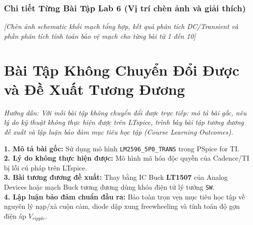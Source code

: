 \documentclass[12pt,a4paper]{report}
\begin{document}
\begin{orangebox}
\centering
\vspace{0.3cm}
\vspace{0.3cm}
\end{orangebox}

\subsection*{Chi tiết Từng Bài Tập Lab 6 (Vị trí chèn ảnh và giải thích)}
\begin{orangebox}
\textit{\color{guidegray}[Chèn ảnh schematic khối mạch tổng hợp, kết quả phân tích DC/Transient và phần phân tích tính toán bảo vệ mạch cho từng bài từ 1 đến 10]}
\end{orangebox}

\chapter{Bài Tập Không Chuyển Đổi Được và Đề Xuất Tương Đương}

\textit{\color{guidegray}
Hướng dẫn: Với mỗi bài tập không chuyển đổi được trực tiếp: mô tả bài gốc, nêu lý do kỹ thuật không thực hiện được trên LTspice, trình bày bài tập tương đương đề xuất và lập luận bảo đảm mục tiêu học tập (Course Learning Outcomes).
}

\begin{orangebox}
\textbf{1. Mô tả bài gốc:} Sử dụng mô hình \texttt{LM2596\_5P0\_TRANS} trong PSpice for TI.\\
\textbf{2. Lý do không thực hiện được:} Mô hình mã hóa độc quyền của Cadence/TI bị lỗi cú pháp trên LTspice.\\
\textbf{3. Bài tương đương đề xuất:} Thay bằng IC Buck \textbf{LT1507} của Analog Devices hoặc mạch Buck tương đương dùng khóa điện tử lý tưởng \texttt{SW}.\\
\textbf{4. Lập luận bảo đảm chuẩn đầu ra:} Bảo toàn trọn vẹn mục tiêu học tập về nguyên lý nạp/xả cuộn cảm, diode dập xung freewheeling và tính toán độ gợn điện áp $V_{ripple}$.
\end{orangebox}
\end{document}

